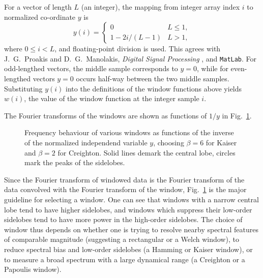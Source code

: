 For a vector of length $L$ (an integer), the mapping from integer array
index $i$ to normalized co-ordinate $y$ is
\begin{equation}
y(i)
   = \left\{ \begin{array}{ll}
   0 & L \le 1, \\
   1 - 2 i / (L - 1) & L > 1,
   \end{array} \right.
\end{equation}
where $0 \le i < L$, and floating-point division is used.  This agrees with
J.~G.~Proakis and D.~G.~Manolakis, \textit{Digital Signal Processing}
\cite{pm}, and \texttt{MatLab}.  For odd-lengthed vectors, the middle
sample corresponds to $y = 0$, while for even-lengthed vectors $y = 0$
occurs half-way between the two middle samples.  Substituting $y(i)$ into
the definitions of the window functions above yields $w(i)$, the value of
the window function at the integer sample $i$.

The Fourier transforms of the windows are shown as functions of $1 / y$ in
Fig.~\ref{f:window-f}.
\begin{figure}
\begin{center}
\end{center}
\caption{\label{f:window-f} Frequency behaviour of various windows as
functions of the inverse of the normalized independend variable $y$,
choosing $\beta=6$ for Kaiser and $\beta=2$ for Creighton.  Solid lines
demark the central lobe, circles mark the peaks of the sidelobes.}
\end{figure}
Since the Fourier transform of windowed data is the Fourier transform of
the data convolved with the Fourier transform of the window,
Fig.~\ref{f:window-f} is the major guideline for selecting a window.  One
can see that windows with a narrow central lobe tend to have higher
sidelobes, and windows which suppress their low-order sidelobes tend to
have more power in the high-order sidelobes.  The choice of window thus
depends on whether one is trying to resolve nearby spectral features of
comparable magnitude (suggesting a rectangular or a Welch window), to
reduce spectral bias and low-order sidelobes (a Hamming or Kaiser window),
or to measure a broad spectrum with a large dynamical range (a Creighton or
a Papoulis window).


